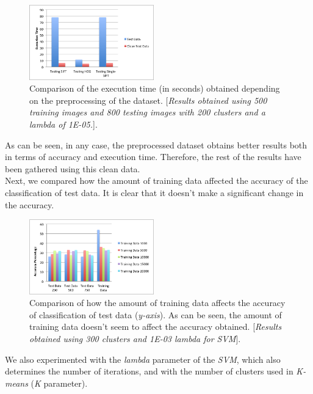 \documentclass{vldb}
\begin{document}
\begin{figure}[!ht]
    \centering
    \includegraphics[width=0.48\textwidth, trim=0 0 0 0, clip]{../Images/7_ExecutionTime.png}
    \caption{Comparison of the execution time (in seconds) obtained depending on the preprocessing of the dataset. [\emph{Results obtained using 500 training images and 800 testing images with 200 clusters and a \emph{lambda} of 1E-05.}].}
\end{figure}
\FloatBarrier

As can be seen, in any case, the preprocessed dataset obtains better results both in terms of accuracy and execution time. Therefore, the rest of the results have been gathered using this clean data. \\

Next, we compared how the amount of training data affected the accuracy of the classification of test data. It is clear that it doesn't make a significant change in the accuracy.

\begin{figure}[!ht]
    \centering
    \includegraphics[width=0.48\textwidth, trim=0 0 0 0, clip]{../Images/1_VaryingTrainingData.png}
    \caption{Comparison of how the amount of training data affects the accuracy of classification of test data (\emph{y-axis}). As can be seen, the amount of training data doesn't seem to affect the accuracy obtained. [\emph{Results obtained using 300 clusters and 1E-03 \emph{lambda} for \emph{SVM}}].}
\end{figure}
\FloatBarrier

We also experimented with the \emph{lambda} parameter of the \emph{SVM}, which also determines the number of iterations, and with the number of clusters used in \emph{K-means} (\emph{K} parameter). \\
\end{document}
